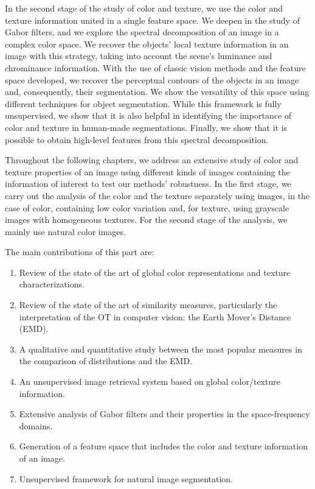 In the second stage of the study of color and texture, we use the color and texture information united in a single feature space. We deepen in the study of Gabor filters, and we explore the spectral decomposition of an image in a complex color space. We recover the objects' local texture information in an image with this strategy, taking into account the scene's luminance and chrominance information. With the use of classic vision methods and the feature space developed, we recover the perceptual contours of the objects in an image and, consequently, their segmentation. We show the versatility of this space using different techniques for object segmentation. While this framework is fully unsupervised, we show that it is also helpful in identifying the importance of color and texture in human-made segmentations. Finally, we show that it is possible to obtain high-level features from this spectral decomposition.

Throughout the following chapters, we address an extensive study of color and texture properties of an image using different kinds of images containing the information of interest to test our methods' robustness. In the first stage, we carry out the analysis of the color and the texture separately using images, in the case of color, containing low color variation and, for texture, using grayscale images with homogeneous textures. For the second stage of the analysis, we mainly use natural color images. 

The main contributions of this part are:
\begin{enumerate}
	\item Review of the state of the art of global color representations and texture characterizations.
	\item Review of the state of the art of similarity measures, particularly the interpretation of the OT in computer vision: the Earth Mover's Distance (EMD).
	\item A qualitative and quantitative study between the most popular measures in the comparison of distributions and the EMD. 
	\item An unsupervised image retrieval system based on global color/texture information.
	\item Extensive analysis of Gabor filters and their properties in the space-frequency domains.
	\item Generation of a feature space that includes the color and texture information of an image.
	\item Unsupervised framework for natural image segmentation.
\end{enumerate}


